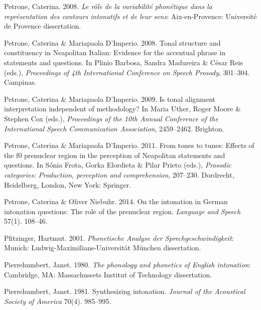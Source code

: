 \documentclass[ number=1
,series=labphon
,output=long
,url=http://langsci-press.org/catalog/book/16
,isbn=978-3-944675-01-5
]{LSP/langsci}
\begin{document}
\begin{thebibliography}{284}
Petrone, Caterina. 2008.
\newblock \emph{Le r{\^o}le de la variabilit{\'e} phon{\'e}tique dans la
  repr{\'e}sentation des contours intonatifs et de leur sens}: Aix-en-Provence:
  Universit{\'e} de Provence dissertation.

Petrone, Caterina \& Mariapaola D'Imperio. 2008.
\newblock Tonal structure and constituency in {N}eapolitan {I}talian:
  {E}vidence for the accentual phrase in statements and questions.
\newblock In Plinio Barbosa, Sandra Madureira \& César Reis (eds.),
  \emph{Proceedings of 4th {I}nternational {C}onference on {S}peech {P}rosody},
  301--304. Campinas.

Petrone, Caterina \& Mariapaola D'Imperio. 2009.
\newblock Is tonal alignment interpretation independent of methodology?
\newblock In Maria Uther, Roger Moore \& Stephen Cox (eds.), \emph{Proceedings
  of the 10th {Annual Conference of the International Speech Communication
  Association}}, 2459--2462. Brighton.

Petrone, Caterina \& Mariapaola D'Imperio. 2011.
\newblock From tones to tunes: {E}ffects of the f0 prenuclear region in the
  perception of {N}eapolitan statements and questions.
\newblock In Sónia Frota, Gorka Elordieta \& Pilar Prieto (eds.),
  \emph{Prosodic categories: {P}roduction, perception and comprehension},
  207--230. Dordrecht, Heidelberg, London, New York: Springer.

Petrone, Caterina \& Oliver Niebuhr. 2014.
\newblock On the intonation in {G}erman intonation questions: {T}he role of the
  prenuclear region.
\newblock \emph{Language and Speech} 57(1). 108--46.

Pfitzinger, Hartmut. 2001.
\newblock \emph{Phonetische {A}nalyse der {S}prechgeschwindigkeit}: Munich:
  Ludwig-Maximilians-Universit{\"a}t M{\"u}nchen dissertation.

Pierrehumbert, Janet. 1980.
\newblock \emph{The phonology and phonetics of {E}nglish intonation}:
  Cambridge, MA: Massachussets Institut of Technology dissertation.

Pierrehumbert, Janet. 1981.
\newblock Synthesizing intonation.
\newblock \emph{Journal of the Acoustical Society of America} 70(4). 985--995.


\end{thebibliography}
\end{document}
